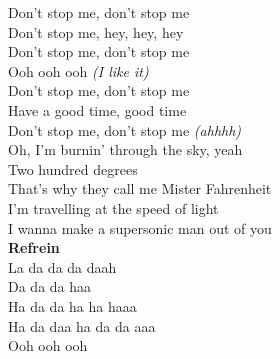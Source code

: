 Don't stop me, don't stop me\\
Don't stop me, hey, hey, hey\\
Don't stop me, don't stop me\\
Ooh ooh ooh \textit{(I like it)}\\
Don't stop me, don't stop me\\
Have a good time, good time\\
Don't stop me, don't stop me \textit{(ahhhh)}\\

Oh, I'm burnin' through the sky, yeah\\
Two hundred degrees\\
That's why they call me Mister Fahrenheit\\
I'm travelling at the speed of light\\
I wanna make a supersonic man out of you\\

\textbf{Refrein}\\

La da da da daah\\
Da da da haa\\
Ha da da ha ha haaa\\
Ha da daa ha da da aaa\\
Ooh ooh ooh\\
